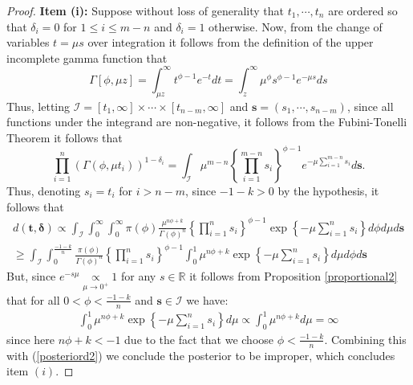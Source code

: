 \documentclass[]{interact}
\newcommand{\R}{\mathbb{R}}
\theoremstyle{plain}%
\theoremstyle{definition}
\theoremstyle{remark}
\begin{document}
\begin{appendix}
\begin{proof}
\vspace{0.3cm}
\noindent \textbf{Item (i):} Suppose without loss of generality that $t_1,\cdots,t_n$ are ordered so that $\delta_i=0$ for $1\leq i\leq m-n$ and $\delta_i=1$ otherwise. Now, from the change of variables $t=\mu s$ over integration it follows from the definition of the upper incomplete gamma function that
\begin{equation*}\Gamma[\phi,\mu z] =\int_{\mu z}^\infty t^{\phi-1} e^{-t}  dt =  \int_z^\infty \mu^\phi s^{\phi-1} e^{-\mu s} ds
\end{equation*}
Thus, letting $\mathcal{I}=[t_1,\infty]\times \cdots \times [t_{n-m},\infty]$ and $\boldsymbol{s} = (s_1,\cdots,s_{n-m})$, since all functions under the integrand are non-negative, it follows from the Fubini-Tonelli Theorem it follows that
\begin{equation*} \prod_{i=1}^n\left(\Gamma(\phi,\mu t_i)\right)^{1-\delta_i} = \int_{\mathcal{I}} \mu^{m-n} \left\{\prod_{i=1}^{m-n} s_i \right\}^{\phi-1}e^{-\mu \sum_{i=1}^{m-n} s_i}d\boldsymbol{s}.
\end{equation*}
Thus, denoting $s_i = t_i$ for $i>n-m$, since $-1-k>0$ by the hypothesis, it follows that 
 \begin{equation}
 \begin{aligned}
 \label{posteriord2}
d(\boldsymbol{t,\delta})\propto \int_{\mathcal{I}} \int_{0}^{\infty}\int_{0}^{\infty}\pi(\phi)\frac{\mu^{n\phi+k}}{\Gamma(\phi)^n}\left\{\prod_{i=1}^n{s_i}\right\}^{\phi-1}\exp\left\{-\mu\sum_{i=1}^n s_i\right\}d\phi d\mu d\boldsymbol{s} \\
\geq \int_{\mathcal{I}} \int_{0}^{\frac{-1-k}{n}}\frac{\pi(\phi)}{\Gamma(\phi)^n}\left\{\prod_{i=1}^n{s_i}\right\}^{\phi-1}\int_{0}^{1}\mu^{n\phi+k}\exp\left\{-\mu\sum_{i=1}^n s_i\right\}d\mu d\phi d\boldsymbol{s}
\end{aligned}
\end{equation}
But, since $e^{-s\mu} \underset{\mu \to 0^+}{\propto} 1$ for any $s\in\R$ it follows from Proposition \ref{proportional2} that for all $0<\phi<\frac{-1-k}{n}$ and $\boldsymbol{s}\in \mathcal{I}$ we have:
\begin{equation*}
 \begin{aligned}
\int_0^1 \mu^{n\phi+k}\exp\left\{-\mu\sum_{i=1}^n s_i\right\} d\mu
\propto \int_0^1 \mu^{n\phi+k} d\mu = \infty
\end{aligned}
\end{equation*}
since here $n\phi+k<-1$ due to the fact that we choose $\phi<\frac{-1-k}{n}$. Combining this with (\ref{posteriord2}) we conclude the posterior to be improper, which concludes item $(i)$.


\end{proof}
\end{appendix}
\end{document}

